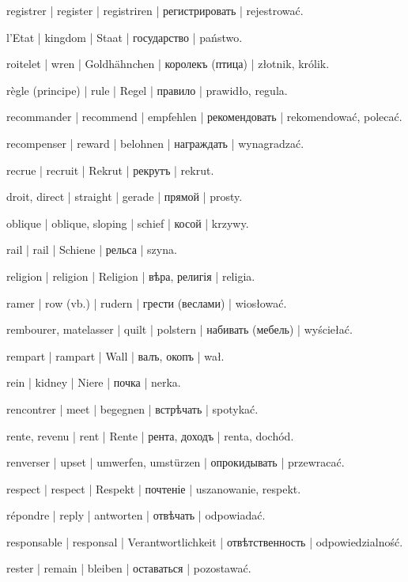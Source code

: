 \begin{outdent}{1em}
registrer | register | registriren | регистрировать | rejestrować.

l’Etat | kingdom | Staat | государство | państwo.

roitelet | wren | Goldhähnchen | королекъ (птица) | złotnik,
królik.

règle (principe) | rule | Regel | правило | prawidło, regula.

recommander | recommend | empfehlen | рекомендовать | rekomendować, polecać.

recompenser | reward | belohnen | награждать | wynagradzać.

recrue | recruit | Rekrut | рекрутъ | rekrut.

droit, direct | straight | gerade | прямой | prosty.

\uvsubentry{}
oblique | oblique, sloping | schief | косой | krzywy.

rail | rail | Schiene | рельса | szyna.

religion | religion | Religion | вѣра, религія | religia.

ramer | row (vb.) | rudern | грести (веслами) | wiosłować.

rembourer, matelasser | quilt | polstern | набивать (мебель) | wyściełać.

rempart | rampart | Wall | валъ, окопъ | wał.

rein | kidney | Niere | почка | nerka.

rencontrer | meet | begegnen | встрѣчать | spotykać.

rente, revenu | rent | Rente | рента, доходъ | renta, dochód.

renverser | upset | umwerfen, umstürzen | опрокидывать | przewracać.

respect | respect | Respekt | почтеніе | uszanowanie,
respekt.

répondre | reply | antworten | отвѣчать | odpowiadać.

\uvsubentry{}
responsable | responsal | Verantwortlichkeit | отвѣтственность | odpowiedzialność.

rester | remain | bleiben | оставаться | pozostawać.


\end{outdent}
